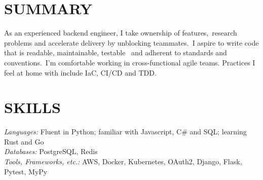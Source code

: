 \documentclass[line,margin]{res}
\begin{document}
\address{\href{mailto://simon.r.crowe@protonmail.com}{simon.r.crowe@protonmail.com}}

 
\begin{resume}
 
\section{SUMMARY} As an experienced backend engineer, I take ownership of features,\
                  research problems and accelerate delivery by unblocking teammates.\
                  I aspire to write code that is readable, maintainable, testable \
                  and adherent to standards and conventions.\
                  I'm comfortable working in cross-functional agile teams.
                  Practices I feel at home with include IaC, CI/CD and TDD. 

 
\section{SKILLS} {\sl Languages:} Fluent in Python;
                familiar with Javascript, C\# and SQL; learning Rust and Go \\
                {\sl Databases:} PostgreSQL, Redis \\
                {\sl Tools, Frameworks, etc.:} AWS, Docker, Kubernetes, OAuth2, Django, Flask, Pytest, MyPy

 

\end{resume}
\end{document}
